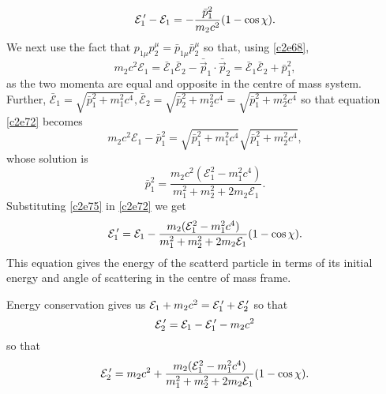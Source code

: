 \begin{enumerate}
\begin{equation}
\mathcal{E}_1^{\,\prime} - \mathcal{E}_1 = -\frac{\bar{p}_1^2}{m_2c^2}(1 - \cos\chi).
\end{equation}
We next use the fact that $p_{1\mu}p_2^\mu = \bar{p}_{1\mu}\bar{p}_2^\mu$ so that,
using \eqref{c2e68},
\begin{equation}\label{c2e73}
m_2c^2\mathcal{E}_1 = \bar{\mathcal{E}}_1\bar{\mathcal{E}}_2 - \bar{\vec{p}}_1\cdot\bar{\vec{p}}_2 = 
\bar{\mathcal{E}}_1\bar{\mathcal{E}}_2 + \bar{p}_1^2,
\end{equation}
as the two momenta are equal and opposite in the centre of mass system. Further, 
$\bar{\mathcal{E}}_1 = \sqrt{\bar{p}_1^2 + m_1^2c^4}, \bar{\mathcal{E}}_2 = \sqrt{\bar{p}_2^2 + m_2^2c^4}
= \sqrt{\bar{p}_1^2 + m_2^2c^4}$ so that equation \eqref{c2e72} becomes
\begin{equation}\label{c2e74}
m_2c^2\mathcal{E}_1 - \bar{p}_1^2 = \sqrt{\bar{p}_1^2 + m_1^2c^4}\sqrt{\bar{p}_1^2 + m_2^2c^4},
\end{equation}
whose solution is
\begin{equation}\label{c2e75}
\bar{p}_1^2 = \frac{m_2c^2(\mathcal{E}_1^2 - m_1^2c^4)}{m_1^2 + m_2^2 + 2m_2\mathcal{E}_1}.
\end{equation}
Substituting \eqref{c2e75} in \eqref{c2e72} we get
\begin{equation}\label{c2e76}
\mathcal{E}_1^{\,\prime} = \mathcal{E}_1 - 
\frac{m_2(\mathcal{E}_1^2 - m_1^2c^4)}{m_1^2 + m_2^2 + 2m_2\mathcal{E}_1}(1 - \cos\chi).
\end{equation}
This equation gives the energy of the scatterd particle in terms of its initial
energy and angle of scattering in the centre of mass frame.

Energy conservation gives us $\mathcal{E}_1 + m_2c^2 = \mathcal{E}_1^{\,\prime} + \mathcal{E}_2^{\,\prime}$ so that
\[
\mathcal{E}_2^{\,\prime} = \mathcal{E}_1 - \mathcal{E}_1^{\,\prime} - m_2c^2
\]
so that
\begin{equation}\label{c2e77}
\mathcal{E}_2^{\,\prime} = m_2c^2 + 
\frac{m_2(\mathcal{E}_1^2 - m_1^2c^4)}{m_1^2 + m_2^2 + 2m_2\mathcal{E}_1}(1 - \cos\chi).
\end{equation}


\end{enumerate}
